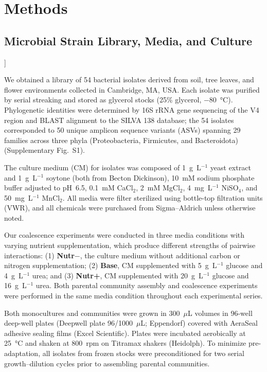 \section{Methods}
\label{sec:methods}

\subsection*{Microbial Strain Library, Media, and Culture}
\label{sec:methods:strains}]

We obtained a library of 54 bacterial isolates derived from soil, tree leaves, and flower environments collected in Cambridge, MA, USA. Each isolate was purified by serial streaking and stored as glycerol stocks (25\% glycerol, $-80$~°C). Phylogenetic identities were determined by 16S rRNA gene sequencing of the V4 region and BLAST alignment to the SILVA 138 database; the 54 isolates corresponded to 50 unique amplicon sequence variants (ASVs) spanning 29 families across three phyla (Proteobacteria, Firmicutes, and Bacteroidota) (Supplementary Fig.~S1). 

The culture medium (CM) for isolates was composed of 1~g~L$^{-1}$ yeast extract and 1~g~L$^{-1}$ soytone (both from Becton Dickinson), 10~mM sodium phosphate buffer adjusted to pH~6.5, 0.1~mM CaCl$_2$, 2~mM MgCl$_2$, 4~mg~L$^{-1}$ NiSO$_4$, and 50~mg~L$^{-1}$ MnCl$_2$. All media were filter sterilized using bottle-top filtration units (VWR), and all chemicals were purchased from Sigma--Aldrich unless otherwise noted. 

Our coalescence experiments were conducted in three media conditions with varying nutrient supplementation, which produce different strengths of pairwise interactions: (1) \textbf{Nutr$-$}, the culture medium without additional carbon or nitrogen supplementation; (2) \textbf{Base}, CM supplemented with 5~g~L$^{-1}$ glucose and 4~g~L$^{-1}$ urea; and (3) \textbf{Nutr+}, CM supplemented with 20~g~L$^{-1}$ glucose and 16~g~L$^{-1}$ urea. Both parental community assembly and coalescence experiments were performed in the same media condition throughout each experimental series.

Both monocultures and communities were grown in 300~$\mu$L volumes in 96-well deep-well plates (Deepwell plate 96/1000~$\mu$L; Eppendorf) covered with AeraSeal adhesive sealing films (Excel Scientific). Plates were incubated aerobically at 25~°C and shaken at 800~rpm on Titramax shakers (Heidolph). To minimize pre-adaptation, all isolates from frozen stocks were preconditioned for two serial growth--dilution cycles prior to assembling parental communities. 

